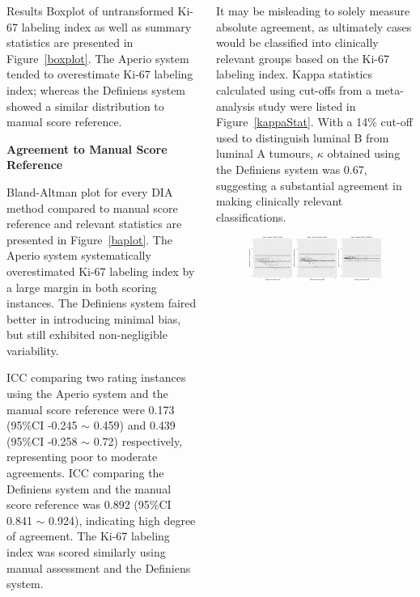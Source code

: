 \documentclass[final]{beamer}
\newlength{\onecolwid}
\begin{document}
\begin{frame}[t]
\begin{columns}[t]
\begin{column}{\onecolwid}
\begin{block}{Results}
Boxplot of untransformed Ki-67 labeling index as well as summary statistics are presented in Figure~\ref{boxplot}. The Aperio system tended to overestimate Ki-67 labeling index; whereas the Definiens system showed a similar distribution to manual score reference.
\newline

{\bf Agreement to Manual Score Reference} \newline

Bland-Altman plot for every DIA method compared to manual score reference and relevant statistics are presented in Figure~\ref{baplot}. The Aperio system systematically overestimated Ki-67 labeling index by a large margin in both scoring instances. The Definiens system faired better in introducing minimal bias, but still exhibited non-negligible variability.

ICC comparing two rating instances using the Aperio system and the manual score reference were 0.173 (95\%CI -0.245 $\sim$ 0.459) and 0.439 (95\%CI -0.258 $\sim$  0.72) respectively, representing poor to moderate agreements. ICC comparing the Definiens system and the manual score reference was 0.892 (95\%CI 0.841 $\sim$ 0.924), indicating high degree of agreement. The Ki-67 labeling index was scored similarly using manual assessment and the Definiens system.

\end{block}

\end{column}


\begin{column}{\onecolwid} %

\begin{block}{}

It may be misleading to solely measure absolute agreement, as ultimately cases would be classified into clinically relevant groups based on the Ki-67 labeling index. Kappa statistics calculated using cut-offs from a meta-analysis study were listed in Figure~\ref{kappaStat}. With a 14\% cut-off used to distinguish luminal B from luminal A tumours,  $\kappa$ obtained using the Definiens system was 0.67, suggesting a substantial agreement in making clinically relevant classifications.


\begin{figure}
\includegraphics[width = \linewidth]{baplot}
\end{figure}


\end{block}
\end{column}
\end{columns}
\end{frame}
\end{document}
